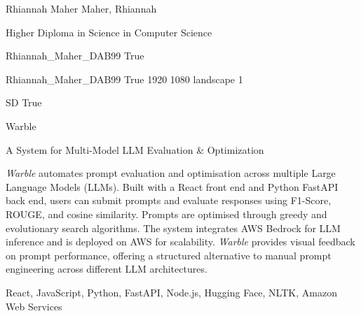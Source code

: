 \documentclass[twoside]{report}
\begin{document}
\begingroup{}\relax



\def\Key{Rhiannah_Maher_DAB99}

{Rhiannah Maher}
{Maher, Rhiannah}

{Higher Diploma in Science in Computer Science}

{Rhiannah_Maher_DAB99}
{True}

{Rhiannah_Maher_DAB99}
{True}
{1920}
{1080}
{landscape}
{1}

{SD}
{True}

{Warble}

{A System for Multi-Model LLM Evaluation \& Optimization}

{\emph{Warble} automates prompt evaluation and optimisation across multiple Large Language Models (LLMs). Built with a React front end and Python FastAPI back end, users can submit prompts and evaluate responses using F1-Score, ROUGE, and cosine similarity. 
Prompts are optimised through greedy and evolutionary search algorithms. The system integrates AWS Bedrock for LLM inference and is deployed on AWS for scalability. \emph{Warble} provides visual feedback on prompt performance, offering a structured alternative to manual prompt engineering across different LLM architectures.}

{React, JavaScript, Python, FastAPI, Node.js, Hugging Face, NLTK, Amazon Web Services}
\end{document}

